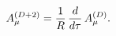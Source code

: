 \begin{equation}
A_{\mu}^{(D+2)}={1 \over R}\, {d \over d\tau}\, A_{\mu}^{(D)}. \label{rec2}
\end{equation}

